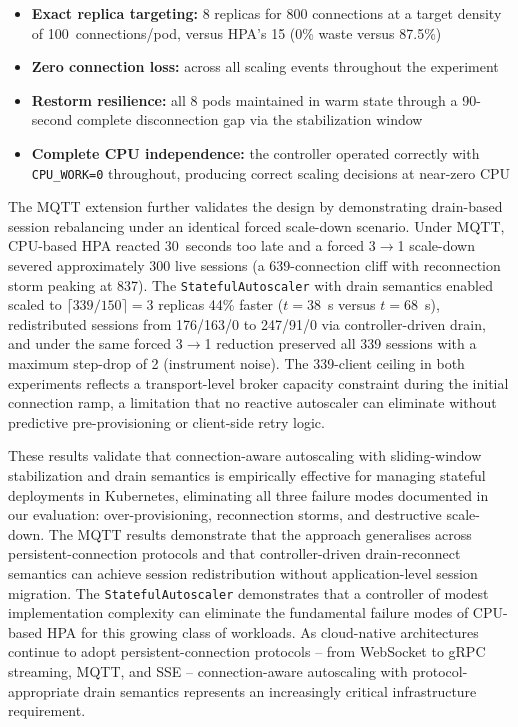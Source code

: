 \documentclass[twocolumn]{svjour3}
\begin{document}
\begin{itemize}[leftmargin=*]
\item \textbf{Exact replica targeting:} 8 replicas for 800 connections at a target density of 100~connections/pod, versus HPA's 15 (0\% waste versus 87.5\%)
\item \textbf{Zero connection loss:} across all scaling events throughout the experiment
\item \textbf{Restorm resilience:} all 8 pods maintained in warm state through a 90-second complete disconnection gap via the stabilization window
\item \textbf{Complete CPU independence:} the controller operated correctly with \texttt{CPU\_WORK=0} throughout, producing correct scaling decisions at near-zero CPU
\end{itemize}

The MQTT extension further validates the design by demonstrating drain-based session rebalancing under an identical forced scale-down scenario. Under MQTT, CPU-based HPA reacted 30~seconds too late and a forced 3$\rightarrow$1 scale-down severed approximately 300 live sessions (a 639-connection cliff with reconnection storm peaking at 837). The \texttt{StatefulAutoscaler} with drain semantics enabled scaled to $\lceil 339/150 \rceil = 3$ replicas 44\% faster ($t=38$~s versus $t=68$~s), redistributed sessions from 176/163/0 to 247/91/0 via controller-driven drain, and under the same forced 3$\rightarrow$1 reduction preserved all 339 sessions with a maximum step-drop of 2 (instrument noise). The 339-client ceiling in both experiments reflects a transport-level broker capacity constraint during the initial connection ramp, a limitation that no reactive autoscaler can eliminate without predictive pre-provisioning or client-side retry logic.

These results validate that connection-aware autoscaling with sliding-window stabilization and drain semantics is empirically effective for managing stateful deployments in Kubernetes, eliminating all three failure modes documented in our evaluation: over-provisioning, reconnection storms, and destructive scale-down. The MQTT results demonstrate that the approach generalises across persistent-connection protocols and that controller-driven drain-reconnect semantics can achieve session redistribution without application-level session migration. The \texttt{StatefulAutoscaler} demonstrates that a controller of modest implementation complexity can eliminate the fundamental failure modes of CPU-based HPA for this growing class of workloads. As cloud-native architectures continue to adopt persistent-connection protocols -- from WebSocket to gRPC streaming, MQTT, and SSE -- connection-aware autoscaling with protocol-appropriate drain semantics represents an increasingly critical infrastructure requirement.
\end{document}
